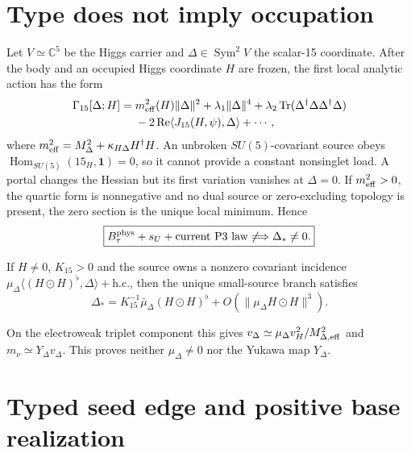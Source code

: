 \section{Type does not imply occupation}

Let $V\simeq\mathbb C^5$ be the Higgs carrier and
$\Delta\in\operatorname{Sym}^2V$ the scalar-15 coordinate. After the body and
an occupied Higgs coordinate $H$ are frozen, the first local analytic action
has the form
\begin{equation}
\begin{split}
\Gamma_{15}[\Delta;H]={}&m_{\rm eff}^2(H)\lVert\Delta\rVert^2
+\lambda_1\lVert\Delta\rVert^4
+\lambda_2\operatorname{Tr}(\Delta^\dagger\Delta\Delta^\dagger\Delta)\\
&-2\operatorname{Re}\langle J_{15}(H,\psi),\Delta\rangle+\cdots,
\end{split}
\label{eq:localaction}
\end{equation}
where $m_{\rm eff}^2=M_\Delta^2+\kappa_{H\Delta}H^\dagger H$. An unbroken
$SU(5)$-covariant source obeys
$\operatorname{Hom}_{SU(5)}(15_H,\mathbf1)=0$, so it cannot provide a
constant nonsinglet load. A portal changes the Hessian but its first variation
vanishes at $\Delta=0$. If $m_{\rm eff}^2>0$, the quartic form is nonnegative
and no dual source or zero-excluding topology is present, the zero section is
the unique local minimum. Hence
\begin{equation}
\boxed{B_\tau^{\rm phys}+s_U+\text{current P3 law}
\not\Longrightarrow\Delta_*\ne0.}
\label{eq:occupationnogo}
\end{equation}

\begin{proposition}
If $H\ne0$, $K_{15}>0$ and the source owns a nonzero covariant incidence
$\mu_\Delta\langle(H\odot H)^\flat,\Delta\rangle+\mathrm{h.c.}$, then the
unique small-source branch satisfies
\begin{equation}
\boxed{\Delta_*=K_{15}^{-1}\bar\mu_\Delta(H\odot H)^\flat
+O(\lVert\mu_\Delta H\odot H\rVert^3).}
\label{eq:inducedoccupation}
\end{equation}
\end{proposition}
On the electroweak triplet component this gives
$v_\Delta\simeq\mu_\Delta v_H^2/M_{\Delta,\rm eff}^2$ and
$m_\nu\simeq Y_\Delta v_\Delta$. This proves neither $\mu_\Delta\ne0$ nor the
Yukawa map $Y_\Delta$.

\section{Typed seed edge and positive base realization}

